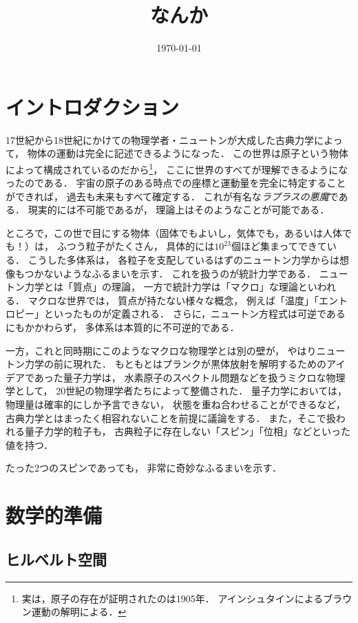 \documentclass{sotsu}
\title{なんか}
\date{\today}
\begin{document}
\maketitle


\section{イントロダクション}

17世紀から18世紀にかけての物理学者・ニュートンが大成した古典力学によって，
物体の運動は完全に記述できるようになった．
この世界は原子という物体によって構成されているのだから\footnote{
    実は，原子の存在が証明されたのは1905年．
    アインシュタインによるブラウン運動の解明による．
}，
ここに世界のすべてが理解できるようになったのである．
宇宙の原子のある時点での座標と運動量を完全に特定することができれば，
過去も未来もすべて確定する．
これが有名な\emph{ラプラスの悪魔}である．
現実的には不可能であるが，
理論上はそのようなことが可能である．

ところで，この世で目にする物体（固体でもよいし，気体でも，あるいは人体でも！）は，
ふつう粒子がたくさん，
具体的には$10^{23}$個ほど集まってできている．
こうした多体系は，
各粒子を支配しているはずのニュートン力学からは想像もつかないようなふるまいを示す．
これを扱うのが統計力学である．
ニュートン力学とは「質点」の理論，
一方で統計力学は「マクロ」な理論といわれる．
マクロな世界では，
質点が持たない様々な概念，
例えば「温度」「エントロピー」といったものが定義される．
さらに，ニュートン方程式は可逆であるにもかかわらず，
多体系は本質的に不可逆的である．

一方，これと同時期にこのようなマクロな物理学とは別の壁が，
やはりニュートン力学の前に現れた．
もともとはプランクが黒体放射を解明するためのアイデアであった量子力学は，
水素原子のスペクトル問題などを扱うミクロな物理学として，
20世紀の物理学者たちによって整備された．
量子力学においては，
物理量は確率的にしか予言できない，
状態を重ね合わせることができるなど，
古典力学とはまったく相容れないことを前提に議論をする．
また，そこで扱われる量子力学的粒子も，
古典粒子に存在しない「スピン」「位相」などといった値を持つ．

たった2つのスピンであっても，
非常に奇妙なふるまいを示す．



\section{数学的準備}

\subsection{ヒルベルト空間}
\end{document}
